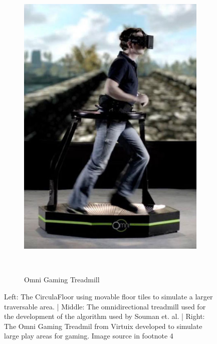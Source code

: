\begin{figure}
\begin{subfigure}[b]{0.21\columnwidth}
		\includegraphics[width=\textwidth]{./figures/422px-Virtuix_Omni_Skyrim_(cropped)}
		\caption{Omni Gaming Treadmill}~\label{fig:virtuixOmni}
	\end{subfigure}
	\caption[]{Left: The CirculaFloor using movable floor tiles to simulate a larger traversable area. | Middle: The omnidirectional treadmill used for the development of the algorithm used by Souman et. al. | Right: The Omni Gaming Treadmil from Virtuix developed to simulate large play areas for gaming. Image source in footnote 4\textcolor{white}{\footnotemark[4]}}
\end{figure}


